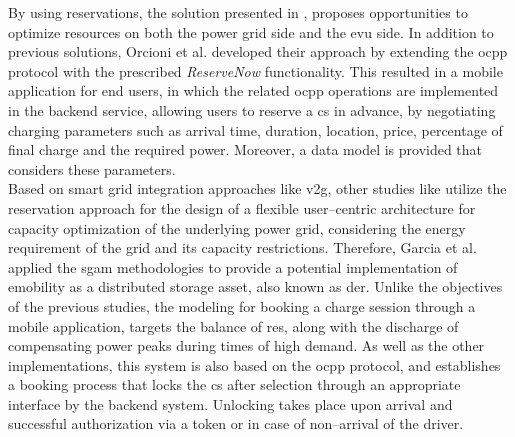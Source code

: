By using reservations, the solution presented in \cite{orcioni_electric_2018}, proposes opportunities to optimize resources on both the power grid side and the \acrshort{evu} side.
In addition to previous solutions, Orcioni et al. developed their approach by extending the \acrshort{ocpp} protocol with the prescribed \textit{ReserveNow} functionality.
This resulted in a mobile application for end users, in which the related \acrshort{ocpp} operations are implemented in the backend service, allowing users to reserve a \acrshort{cs} in advance, by negotiating charging parameters such as arrival time, duration, location, price, percentage of final charge and the required power.
Moreover, a data model is provided that considers these parameters. \\
\noindent Based on smart grid integration approaches like \acrshort{v2g}, other studies like \cite{garcia_sgam-based_2023} utilize the reservation approach for the design of a flexible user--centric architecture for capacity optimization of the underlying power grid, considering the energy requirement of the grid and its capacity restrictions.
Therefore, Garcia et al. applied the \acrshort{sgam} \cite{noauthor_sgam_nodate} methodologies to provide a potential implementation of \acrshort{emobility} as a distributed storage asset, also known as \acrshort{der}.
Unlike the objectives of the previous studies, the modeling for booking a charge session through a mobile application, targets the balance of \acrshort{res}, along with the discharge of  compensating power peaks during times of high demand. 
As well as the other implementations, this system is also based on the \acrshort{ocpp} protocol, and establishes a booking process that locks the \acrshort{cs} after selection through an appropriate interface by the backend system. Unlocking takes place upon arrival and successful authorization via a token or in case of non--arrival of the driver. \\
